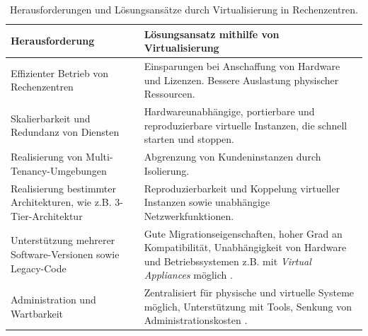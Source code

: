 \documentclass[../main.tex]{subfiles}
\begin{document}
		\vspace{0.5cm}
		\begin{table}[htp]
			\begin{centering}
			\begin{tabularx}{\textwidth}{>{\hsize=1\hsize}X|>{\hsize=1\hsize}X}
				\hline
				\textbf{Herausforderung} & \textbf{Lösungsansatz mithilfe von Virtualisierung} \\
				\hline
				Effizienter Betrieb von Rechenzentren
				& Einsparungen bei Anschaffung von Hardware und Lizenzen. Bessere Auslastung physischer Ressourcen. \\
				\hline
				Skalierbarkeit und Redundanz von Diensten
				& Hardwareunabhängige, portierbare und reproduzierbare virtuelle Instanzen, die schnell starten und stoppen. \\
				\hline
				Realisierung von Multi-Tenancy-Umgebungen
				& Abgrenzung von Kundeninstanzen durch Isolierung. \\
				\hline
				Realisierung bestimmter Architekturen, wie z.B. 3-Tier-Architektur
				& Reproduzierbarkeit und Koppelung virtueller Instanzen sowie unabhängige Netzwerkfunktionen. \\
				\hline
				Unterstützung mehrerer Software-Versionen sowie Legacy-Code
				& Gute Migrationseigenschaften, hoher Grad an Kompatibilität, Unabhängigkeit von Hardware und Betriebssystemen z.B. mit \emph{Virtual Appliances} möglich \cite[S.672f.]{tanenbaumOS}.\\
				\hline
				Administration und Wartbarkeit
				& Zentralisiert für physische und virtuelle Systeme möglich, Unterstützung mit Tools, Senkung von Administrationskosten \cite[S.1]{bsiVirt}. \\
				\hline
		  \end{tabularx}
			\vspace{0.5cm}
			\caption{Herausforderungen und Lösungsansätze durch Virtualisierung in Rechenzentren.}
			\label{tab:virtAdvantages}
			\end{centering}
		\end{table}
\end{document}
